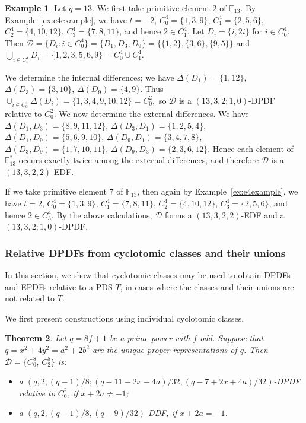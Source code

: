 \documentclass[12pt, a4paper]{article}
\newtheorem{theorem}{Theorem}[section]
\theoremstyle{definition}
\newtheorem{example}[theorem]{Example}
\begin{document}
	\begin{example}
		Let $q=13$. We first take primitive element $2$ of $\mathbb{F}_{13}$. By Example~\ref{ex:e4example}, we have
		$t=-2$, $C_0^4=\{1,3,9\}$, $C_1^4=\{2,5,6\}$, $C_2^4=\{4,10,12\}$, $C_3^4=\{7,8,11\}$,
		and hence $2\in C_1^4$. Let $D_i=\{i,2i\}$ for $i\in C_0^4$. Then 
		$\mathcal{D}= \{D_i : i \in C_0^4\}= \{D_1, D_3, D_9\}=\{\{1,2\},\{3,6\},\{9,5\}\}$ and 
		$\bigcup_{i\in C_0^4}D_i=\{1,2,3,5,6,9\}=C_0^4\cup C_1^4$.
		
		We determine the internal differences; we have 
		$\Delta(D_1)=\{1,12\}$, $\Delta(D_3)=\{3,10\}$, $\Delta(D_9)=\{4,9\}$. Thus
		$
		\cup_{i\in C_0^4}\Delta(D_i)=\{1,3,4,9,10,12\}=C_0^2,
		$
		so $\mathcal{D}$ is a $(13,3,2;1,0)$-DPDF relative to $C_0^2$.
		We now  determine the external differences. We have 
		$\Delta(D_1, D_3)=\{8,9,11,12\}$, 
		$\Delta(D_3, D_1)=\{1,2,5,4\}$, 
		$\Delta(D_1, D_9)=\{5,6,9,10\}$, 
		$\Delta(D_9, D_1)=\{3,4,7,8\}$, 
		$\Delta(D_3, D_9)=\{1,7,10,11\}$, 
		$\Delta(D_9, D_3)=\{2,3,6,12\}$. 
		Hence each element of $\mathbb{F}_{13}^*$ occurs exactly twice among the external differences, and therefore $\mathcal{D}$ is a $(13,3,2,2)$-EDF.
	
If  we take primitive element $7$ of $\mathbb{F}_{13}$, then again  by Example~\ref{ex:e4example}, we have
$t=2$, $C_0^4=\{1,3,9\}$, $C_1^4=\{7,8,11\}$, $C_2^4=\{4,10,12\}$, $C_3^4=\{2,5,6\}$, and hence $2\in C_3^4$.  By the above calculations, $\mathcal{D}$ forms a $(13,3,2,2)$-EDF and a $(13,3,2;1,0)$-DPDF.
\end{example}



\subsubsection{Relative DPDFs from cyclotomic classes and their unions}

In this section, we show that cyclotomic classes may be used to obtain DPDFs and EPDFs relative to a PDS $T$, in cases where the classes and their unions are not related to $T$.

We first present constructions using individual cyclotomic classes. 

\begin{theorem}\label{thm:DPDFC0C2}
Let $q=8f+1$ be a prime power with $f$ odd. Suppose that
$q=x^2+4y^2=a^2+2b^2$ are the unique proper representations of $q$. 
Then $\mathcal D=\{C_0^{8},\,C_2^{8}\}$ is:
\begin{itemize}
\item a $(q, 2, {(q-1)}/{8}; {(q-11-2x-4a)}/{32}, {(q-7+2x+4a)}/{32})$-DPDF relative to $C_0^2$, if $x + 2a \ne -1$;
\item a $(q, 2, (q-1)/8, (q-9)/32)$-DDF, if $x+2a=-1$. 
\end{itemize}
\end{theorem}
\end{document}
